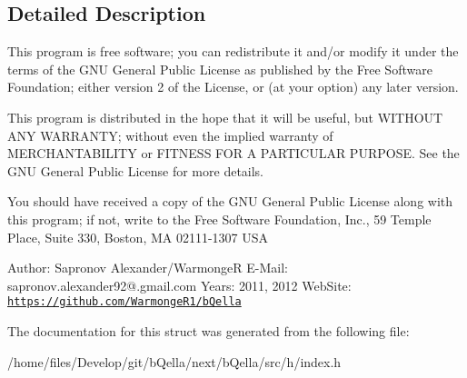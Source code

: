 \subsection{Detailed Description}
This program is free software; you can redistribute it and/or modify it under the terms of the GNU General Public License as published by the Free Software Foundation; either version 2 of the License, or (at your option) any later version.

This program is distributed in the hope that it will be useful, but WITHOUT ANY WARRANTY; without even the implied warranty of MERCHANTABILITY or FITNESS FOR A PARTICULAR PURPOSE. See the GNU General Public License for more details.

You should have received a copy of the GNU General Public License along with this program; if not, write to the Free Software Foundation, Inc., 59 Temple Place, Suite 330, Boston, MA 02111-\/1307 USA

Author: Sapronov Alexander/WarmongeR E-\/Mail: sapronov.alexander92@.gmail.com Years: 2011, 2012 WebSite: \href{https://github.com/WarmongeR1/bQella}{\tt https://github.com/WarmongeR1/bQella} 

The documentation for this struct was generated from the following file:\begin{DoxyCompactItemize}
\item 
/home/files/Develop/git/bQella/next/bQella/src/h/index.h\end{DoxyCompactItemize}
